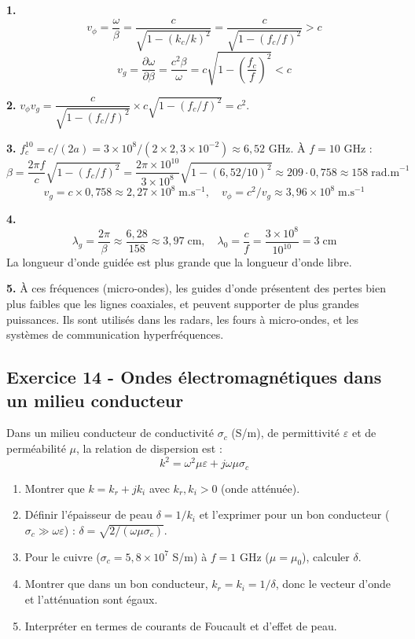 \documentclass[12pt,a4paper]{article}
\begin{document}
\begin{boitecorrige}
\textbf{1.}
\[
v_\phi = \frac{\omega}{\beta} = \frac{c}{\sqrt{1-(k_c/k)^2}} = \frac{c}{\sqrt{1-(f_c/f)^2}} > c
\]
\[
v_g = \frac{\partial\omega}{\partial\beta} = \frac{c^2\beta}{\omega} = c\sqrt{1-\left(\frac{f_c}{f}\right)^2} < c
\]

\textbf{2.} $v_\phi v_g = \dfrac{c}{\sqrt{1-(f_c/f)^2}}\times c\sqrt{1-(f_c/f)^2} = c^2$.

\textbf{3.} $f_c^{10} = c/(2a) = 3\times10^8/(2\times2{,}3\times10^{-2})\approx6{,}52$ GHz. À $f=10$ GHz :
\[
\beta = \frac{2\pi f}{c}\sqrt{1-(f_c/f)^2} = \frac{2\pi\times10^{10}}{3\times10^8}\sqrt{1-(6{,}52/10)^2}\approx 209\cdot0{,}758\approx 158\;\text{rad.m}^{-1}
\]
\[
v_g = c\times0{,}758\approx 2{,}27\times10^8\;\text{m.s}^{-1}, \quad v_\phi = c^2/v_g\approx 3{,}96\times10^8\;\text{m.s}^{-1}
\]

\textbf{4.}
\[
\lambda_g = \frac{2\pi}{\beta}\approx\frac{6{,}28}{158}\approx3{,}97\;\text{cm}, \quad \lambda_0 = \frac{c}{f} = \frac{3\times10^8}{10^{10}} = 3\;\text{cm}
\]
La longueur d'onde guidée est plus grande que la longueur d'onde libre.

\textbf{5.} À ces fréquences (micro-ondes), les guides d'onde présentent des pertes bien plus faibles que les lignes coaxiales, et peuvent supporter de plus grandes puissances. Ils sont utilisés dans les radars, les fours à micro-ondes, et les systèmes de communication hyperfréquences.
\end{boitecorrige}

\subsection*{Exercice 14 - Ondes électromagnétiques dans un milieu conducteur \niveau{\difficile}}

\begin{boiteexercice}
Dans un milieu conducteur de conductivité $\sigma_c$ (S/m), de permittivité $\varepsilon$ et de perméabilité $\mu$, la relation de dispersion est :
\[
k^2 = \omega^2\mu\varepsilon + j\omega\mu\sigma_c
\]
\begin{enumerate}
  \item Montrer que $k = k_r + jk_i$ avec $k_r,k_i > 0$ (onde atténuée).
  \item Définir l'épaisseur de peau $\delta = 1/k_i$ et l'exprimer pour un bon conducteur ($\sigma_c\gg\omega\varepsilon$) : $\delta = \sqrt{2/(\omega\mu\sigma_c)}$.
  \item Pour le cuivre ($\sigma_c = 5{,}8\times10^7$ S/m) à $f = 1$ GHz ($\mu = \mu_0$), calculer $\delta$.
  \item Montrer que dans un bon conducteur, $k_r = k_i = 1/\delta$, donc le vecteur d'onde et l'atténuation sont égaux.
  \item Interpréter en termes de courants de Foucault et d'effet de peau.
\end{enumerate}
\end{boiteexercice}
\end{document}
